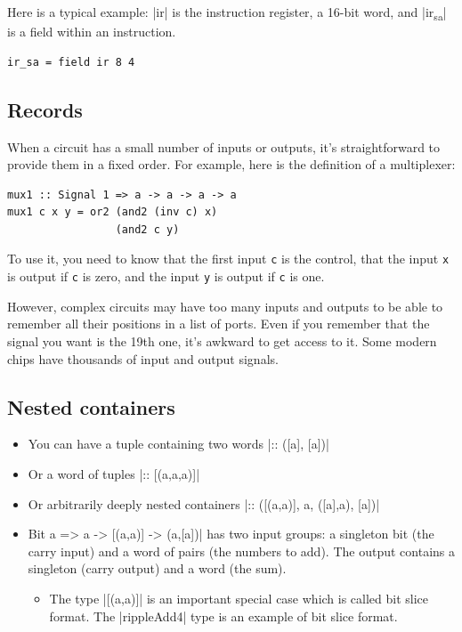 \documentclass[]{svmono}
\begin{document}
Here is a typical example: |ir| is the instruction register, a 16-bit
word, and |ir\textsubscript{sa}| is a field within an instruction.

\begin{verbatim}
ir_sa = field ir 8 4
\end{verbatim}
\subsection*{Records}
\label{sec:org0092746}

When a circuit has a small number of inputs or outputs, it's
straightforward to provide them in a fixed order.  For example, here
is the definition of a multiplexer:

\begin{verbatim}
mux1 :: Signal 1 => a -> a -> a -> a
mux1 c x y = or2 (and2 (inv c) x)
                 (and2 c y)
\end{verbatim}

To use it, you need to know that the first input \texttt{c} is the control,
that the input \texttt{x} is output if \texttt{c} is zero, and the input \texttt{y} is
output if \texttt{c} is one.

However, complex circuits may have too many inputs and outputs to be
able to remember all their positions in a list of ports.  Even if
you remember that the signal you want is the 19th one, it's awkward
to get access to it.  Some modern chips have thousands of input and
output signals.
\subsection*{Nested containers}
\label{sec:org6b74b6c}

\begin{itemize}
\item You can have a tuple containing two words |:: ([a], [a])|
\item Or a word of tuples |:: [(a,a,a)]|
\item Or arbitrarily deeply nested containers |:: ([(a,a)], a, ([a],a),
{[}a])|
\item[{|rippleAdd4}] Bit a => a -> [(a,a)] -> (a,[a])| has two input
groups: a singleton bit (the carry input) and a word of pairs (the
numbers to add).  The output contains a singleton (carry output) and
a word (the sum).
\begin{itemize}
\item The type |[(a,a)]| is an important special case
which is called bit slice format.  The |rippleAdd4|
type is an example of bit slice format.
\end{itemize}
\end{itemize}
\end{document}
